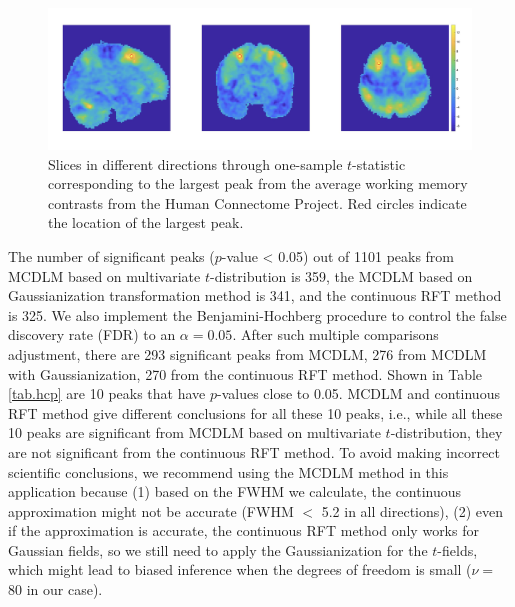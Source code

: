 \documentclass{article}
\begin{document}
\begin{figure}[!htp]
\centering
\includegraphics[width = 17cm]{figure/presentation1.png}
\caption{Slices in different directions through one-sample $t$-statistic corresponding to the largest peak from the average working memory contrasts from the Human Connectome Project. Red circles indicate the location of the largest peak.\label{fig.hcp}}
\end{figure}

The number of significant peaks ($p$-value < 0.05) out of 1101 peaks from MCDLM based on multivariate $t$-distribution is 359, the MCDLM based on Gaussianization transformation method is 341, and the continuous RFT method is 325. We also implement the Benjamini-Hochberg procedure to control the false discovery rate (FDR) to an $\alpha = 0.05$. After such multiple comparisons adjustment, there are 293 significant peaks from MCDLM, 276 from MCDLM with Gaussianization, 270 from the continuous RFT method. Shown in Table \ref{tab.hcp} are 10 peaks that have $p$-values close to 0.05. MCDLM and continuous RFT method give different conclusions for all these 10 peaks, i.e., while all these 10 peaks are significant from MCDLM based on multivariate $t$-distribution, they are not significant from the continuous RFT method. To avoid making incorrect scientific conclusions, we recommend using the MCDLM method in this application because (1) based on the FWHM we calculate, the continuous approximation might not be accurate (FWHM $<$ 5.2 in all directions), (2) even if the approximation is accurate, the continuous RFT method only works for Gaussian fields, so we still need to apply the Gaussianization for the $t$-fields, which might lead to biased inference when the degrees of freedom is small ($\nu = $ 80 in our case). 
\end{document}
